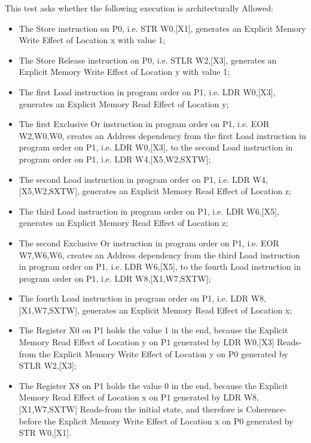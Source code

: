 This test asks whether the following execution is architecturally Allowed:

\begin{itemize}
  \item The Store instruction on P0, i.e. STR W0,[X1], generates an Explicit Memory Write Effect of Location x with value 1;
  \item The Store Release instruction on P0, i.e. STLR W2,[X3], generates an Explicit Memory Write Effect of Location y with value 1;
  \item The first Load instruction in program order on P1, i.e. LDR W0,[X3], generates an Explicit Memory Read Effect of Location y;
  \item The first Exclusive Or instruction in program order on P1, i.e. EOR W2,W0,W0, creates an Address dependency from the first Load instruction in program order on P1, i.e. LDR W0,[X3], to the second Load instruction in program order on P1, i.e. LDR W4,[X5,W2,SXTW];
  \item The second Load instruction in program order on P1, i.e. LDR W4,[X5,W2,SXTW], generates an Explicit Memory Read Effect of Location z;
  \item The third Load instruction in program order on P1, i.e. LDR W6,[X5], generates an Explicit Memory Read Effect of Location z;
  \item The second Exclusive Or instruction in program order on P1, i.e. EOR W7,W6,W6, creates an Address dependency from the third Load instruction in program order on P1, i.e. LDR W6,[X5], to the fourth Load instruction in program order on P1, i.e. LDR W8,[X1,W7,SXTW];
  \item The fourth Load instruction in program order on P1, i.e. LDR W8,[X1,W7,SXTW], generates an Explicit Memory Read Effect of Location x;
  \item The Register X0 on P1 holds the value 1 in the end, because the Explicit Memory Read Effect of Location y on P1 generated by LDR W0,[X3] Reads-from the Explicit Memory Write Effect of Location y on P0 generated by STLR W2,[X3];
  \item The Register X8 on P1 holds the value 0 in the end, because the Explicit Memory Read Effect of Location x on P1 generated by LDR W8,[X1,W7,SXTW] Reads-from the initial state, and therefore is Coherence-before the Explicit Memory Write Effect of Location x on P0 generated by STR W0,[X1].
\end{itemize}
